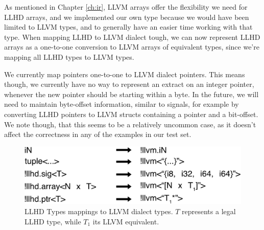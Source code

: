 

As mentioned in Chapter \ref{ch:ir}, LLVM arrays offer the flexibility we need for LLHD arrays, and we implemented our own type because we would have been limited to LLVM types, and to generally have an easier time working with that type. When mapping LLHD to LLVM dialect tough, we can now represent LLHD arrays as a one-to-one conversion to LLVM arrays of equivalent types, since we're mapping all LLHD types to LLVM types.

We currently map pointers one-to-one to LLVM dialect pointers. This means though, we currently have no way to represent an extract on an integer pointer, whenever the new pointer should be starting within a byte. In the future, we will need to maintain byte-offset information, similar to signals, for example by converting LLHD pointers to LLVM structs containing a pointer and a bit-offset. We note though, that this seems to be a relatively uncommon case, as it doesn't affect the correctness in any of the examples in our test set.

\begin{figure}[ht]
    \centering
    \includegraphics[width=\textwidth]{gfx/types mapping.png}
    \caption[LLHD Types mappings to LLVM dialect types.]{LLHD Types mappings to LLVM dialect types. $T$ represents a legal LLHD type, while $T_1$ its LLVM equivalent.}
\end{figure}

